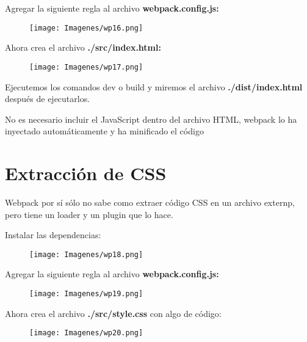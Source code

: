 \item Agregar la siguiente regla al archivo \textbf{ webpack.config.js:}
\begin{figure}[h]
    \centering
    \texttt{[image: Imagenes/wp16.png]}
    \label{fig:my_label}
\end{figure}

\newpage
\item Ahora crea el archivo \textbf{./src/index.html:}
\begin{figure}[h]
    \centering
    \texttt{[image: Imagenes/wp17.png]}
    \label{fig:my_label}
\end{figure}

\item Ejecutemos los comandos dev o build y miremos el archivo \textbf{./dist/index.html} después de ejecutarlos.

\item No es necesario incluir el JavaScript dentro del archivo HTML, webpack lo ha inyectado automáticamente y ha minificado el código

\section{Extracción de CSS}
\item Webpack por sí sólo no sabe como extraer código CSS en un archivo externp, pero tiene un loader y un plugin que lo hace.

\item Instalar las dependencias:
\begin{figure}[h]
    \centering
    \texttt{[image: Imagenes/wp18.png]}
    \label{fig:my_label}
\end{figure}

\item Agregar la siguiente regla al archivo \textbf{ webpack.config.js:}
\newpage
\begin{figure}[h]
    \centering
    \texttt{[image: Imagenes/wp19.png]}
    \label{fig:my_label}
\end{figure}

\newpage
\item Ahora crea el archivo \textbf{./src/style.css} con algo de código:
\begin{figure}[h]
   \centering
    \texttt{[image: Imagenes/wp20.png]}
    \label{fig:my_label}
\end{figure}

